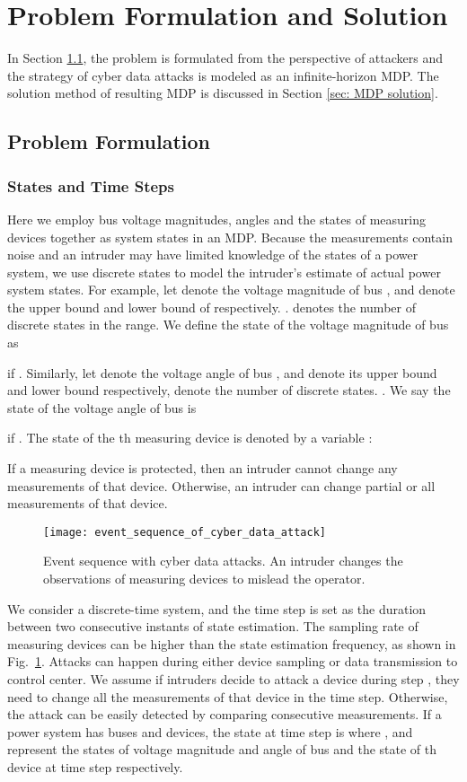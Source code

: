 \documentclass[conference,letterpaper,10pt]{IEEEtran}
\begin{document}
\section{Problem Formulation and Solution}\label{sec:method}
In Section \ref{sec: problem formulation}, the problem is formulated from the perspective of attackers and the strategy of cyber data attacks is modeled as an infinite-horizon MDP. The solution method of resulting MDP is discussed in Section \ref{sec: MDP solution}.
\subsection{Problem Formulation}\label{sec: problem formulation}
\subsubsection{States and Time Steps}	


Here we employ bus voltage magnitudes, angles and the states of measuring devices together as system states in an MDP. Because the measurements contain noise and an intruder may have limited knowledge of the states of a power system, we use discrete states to model the intruder's estimate of actual power system states. 
For example, let  denote the voltage magnitude of bus ,  and  denote the upper bound and lower bound of  respectively. .  denotes the number of discrete states in the range. We define the state of the voltage magnitude of bus  as

if .
Similarly, let  denote the voltage angle of bus ,  and  denote its upper bound and lower bound respectively,  denote the number of discrete states. . We say the state of the voltage angle of bus  is

if .
The state of the th measuring device is denoted by a variable :

If a measuring device is protected, then an intruder cannot change any measurements of that device. Otherwise, an intruder can change partial or all measurements of that device. 

\begin{figure}	
	\centering
	\texttt{[image: event\_sequence\_of\_cyber\_data\_attack]}
	\caption{Event sequence with cyber data attacks. An intruder changes the observations of measuring devices to mislead the operator.}\vspace{-5mm}
	\label{fig:sequence}
\end{figure}


We consider a discrete-time system, and the time step is set as the duration between two consecutive instants of state estimation. The sampling rate of measuring devices can be higher than the state estimation frequency, as shown in Fig.~\ref{fig:sequence}. Attacks can happen during either  device sampling or  data transmission to control center. We assume if intruders decide to attack a device during step , they need to change all the measurements of that device in the time step. Otherwise, the attack can be easily detected by comparing consecutive measurements. 
If a power system has  buses and   devices,  the state  at time step  is 
where ,  and  represent the states of voltage magnitude and angle of bus  and the state of th device at time step  respectively. 
\end{document}
